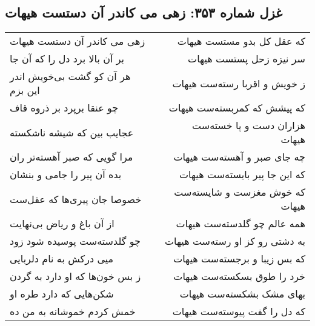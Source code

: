 \begin{center}
\section*{غزل شماره ۳۵۳: زهی می کاندر آن دستست هیهات}
\label{sec:0353}
\begin{longtable}{l p{0.5cm} r}
زهی می کاندر آن دستست هیهات
&&
که عقل کل بدو مستست هیهات
\\
بر آن بالا برد دل را که آن جا
&&
سر نیزه زحل پستست هیهات
\\
هر آن کو گشت بی‌خویش اندر این بزم
&&
ز خویش و اقربا رسته‌ست هیهات
\\
چو عنقا برپرد بر ذروه قاف
&&
که پیشش که کمربسته‌ست هیهات
\\
عجایب بین که شیشه ناشکسته
&&
هزاران دست و پا خسته‌ست هیهات
\\
مرا گویی که صبر آهسته‌تر ران
&&
چه جای صبر و آهسته‌ست هیهات
\\
بده آن پیر را جامی و بنشان
&&
که این جا پیر بایسته‌ست هیهات
\\
خصوصا جان پیری‌ها که عقل‌ست
&&
که خوش مغزست و شایسته‌ست هیهات
\\
از آن باغ و ریاض بی‌نهایت
&&
همه عالم چو گلدسته‌ست هیهات
\\
چو گلدسته‌ست پوسیده شود زود
&&
به دشتی رو کز او رسته‌ست هیهات
\\
میی درکش به نام دلربایی
&&
که بس زیبا و برجسته‌ست هیهات
\\
ز بس خون‌ها که او دارد به گردن
&&
خرد را طوق بسکسته‌ست هیهات
\\
شکن‌هایی که دارد طره او
&&
بهای مشک بشکسته‌ست هیهات
\\
خمش کردم خموشانه به من ده
&&
که دل را گفت پیوسته‌ست هیهات
\\
\end{longtable}
\end{center}
